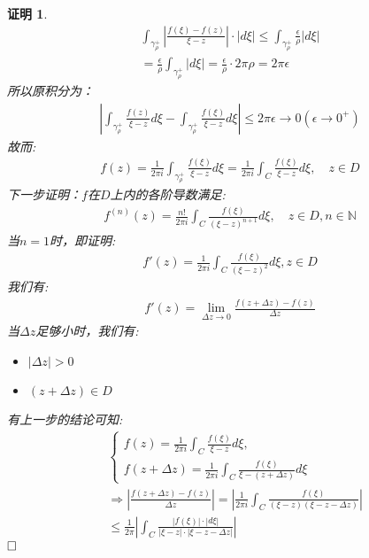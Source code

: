 \documentclass{ctexart}
\newcommand{\。}{．} %
\newenvironment{lanse}{
    \begin{tcolorbox}[breakable,enhanced, colback=qlan, boxrule=0pt, frame hidden,
        borderline west={0.7mm}{0.1mm}{slan}]
    }
    {\end{tcolorbox}}
\theoremstyle{t} %
\newtheorem*{zmhj}{\color{slan} 证明}
\newenvironment{zm}{\begin{lanse}\begin{zmhj}}{$\hfill \square$\end{zmhj}\end{lanse}}
\begin{document}
\begin{zm}
    \begin{align*}
        \int_{\gamma_\rho^+}\left|\frac{f(\xi)-f(z)}{\xi-z}\right|\cdot |d\xi|\le \int_{\gamma_\rho^+}\frac{\epsilon}{\rho}|d\xi|\\
        =\frac{\epsilon}{\rho}\int_{\gamma_\rho^+}|d\xi|=\frac{\epsilon}{\rho}\cdot 2\pi \rho=2\pi \epsilon
        \end{align*}
    所以原积分为：
    \begin{align*}
        \left|\int_{\gamma_\rho^+}\frac{f(z)}{\xi-z}d\xi-\int_{\gamma_\rho^+}\frac{f(\xi)}{\xi-z}d\xi\right|\le 2\pi \epsilon\to 0(\epsilon\to 0^+)
    \end{align*}
    故而:
    \begin{align}
        f(z)=\frac{1}{2\pi i}\int_{\gamma_\rho^+}\frac{f(\xi)}{\xi-z}d\xi=\frac{1}{2\pi i}\int_{C}\frac{f(\xi)}{\xi-z}d\xi,\quad z\in D
    \end{align}
    下一步证明：$f$在$D$上内的各阶导数满足:
    \begin{align}
        f^(n)(z)=\frac{n!}{2\pi i}\int_{C}\frac{f(\xi)}{(\xi-z)^{n+1}}d\xi,\quad z\in D,n\in\mathbb{N}
    \end{align}
    当$n=1$时，即证明:
    \begin{align*}
        f'(z)=\frac{1}{2\pi i}\int_{C}^{}\frac{f(\xi)}{(\xi-z)^2}d\xi,z\in D
    \end{align*}
    我们有:
    \begin{align*}
        f'(z)=\lim_{\Delta z\to 0}\frac{f(z+\Delta z)-f(z)}{\Delta z}
    \end{align*}
    当$\Delta z$足够小时，我们有:
    \begin{itemize}
        \item $|\Delta z|>0$
        \item $(z+\Delta z)\in D$
    \end{itemize}
    有上一步的结论可知:
    \begin{align*}
        &\begin{cases}
            f(z)=\frac{1}{2\pi i}\int_{C}\frac{f(\xi)}{\xi-z}d\xi,\\
            f(z+\Delta z)=\frac{1}{2\pi i}\int_{C}\frac{f(\xi)}{\xi-(z+\Delta z)}d\xi
        \end{cases}\\
        &\Rightarrow \left|\frac{f(z+\Delta z)-f(z)}{\Delta z}\right|=\left|\frac{1}{2\pi i}\int_{C}\frac{f(\xi)}{(\xi-z)(\xi-z-\Delta z)}\right|\\
        &\le \frac{1}{2\pi}\left|\int_{C}\frac{|f(\xi)|\cdot |d\xi|}{|\xi-z|\cdot |\xi-z-\Delta z|}\right|

\end{align*}
\end{zm}
\end{document}
